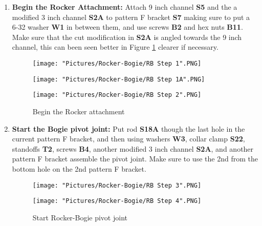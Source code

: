 \documentclass[12pt]{article}
\begin{document}
\begin{enumerate}
\item \textbf{Begin the Rocker Attachment:}  Attach 9 inch channel \textbf{S5} and the a modified 3 inch channel \textbf{S2A} to pattern F bracket \textbf{S7} making sure to put a 6-32 washer \textbf{W1} in between them, and use screws \textbf{B2} and hex nuts \textbf{B11}. Make sure that the cut modification in \textbf{S2A} is angled towards the 9 inch channel, this can been seen better in Figure \ref {RB2} clearer if necessary. 

\begin{figure}[H]
  	\centering
  	\begin{minipage}[b]{0.30\textwidth}
    		\texttt{[image: "Pictures/Rocker-Bogie/RB Step 1".PNG]}
  	\end{minipage}
  	\hfill
  	\begin{minipage}[b]{0.30\textwidth}
    		\texttt{[image: "Pictures/Rocker-Bogie/RB Step 1A".PNG]}
  	\end{minipage}
    	\hfill
  	\begin{minipage}[b]{0.30\textwidth}
    		\texttt{[image: "Pictures/Rocker-Bogie/RB Step 2".PNG]}
  	\end{minipage}
  	\caption{Begin the Rocker attachment}
\end{figure}



\item \textbf{Start the Bogie pivot joint:} Put rod \textbf{S18A} though the last hole in the current pattern F bracket, and then using washers \textbf{W3}, collar clamp \textbf{S22}, standoffs \textbf{T2}, screws \textbf{B4}, another modified 3 inch channel \textbf{S2A}, and another pattern F bracket assemble the pivot joint. Make sure to use the 2nd from the bottom hole on the 2nd pattern F bracket. 


\begin{figure}[H]
  \centering
  \begin{minipage}[b]{0.45\textwidth}
    \texttt{[image: "Pictures/Rocker-Bogie/RB Step 3".PNG]}
  \end{minipage}
  \hfill
  \begin{minipage}[b]{0.45\textwidth}
    \texttt{[image: "Pictures/Rocker-Bogie/RB Step 4".PNG]}
  \end{minipage}
  \caption{Start Rocker-Bogie pivot joint}
  \label{RB2}
\end{figure}





\end{enumerate}
\end{document}
